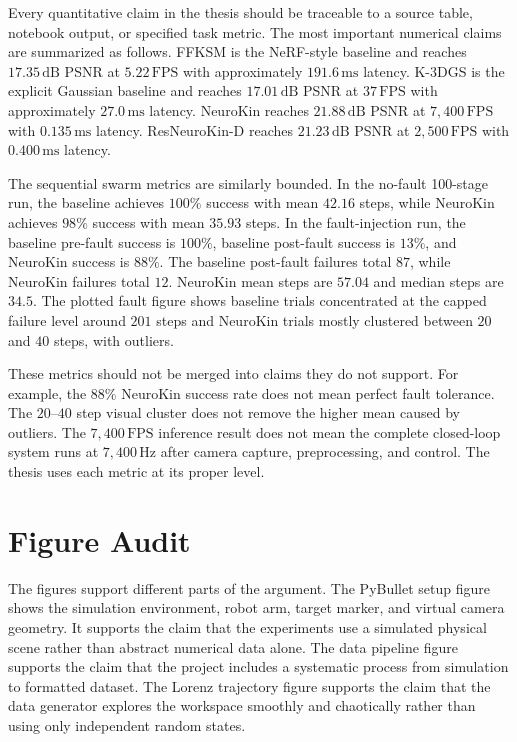 \documentclass[12pt,a4paper,oneside]{report}
\begin{document}
Every quantitative claim in the thesis should be traceable to a source table, notebook output, or specified task metric. The most important numerical claims are summarized as follows. FFKSM is the NeRF-style baseline and reaches $17.35\,\mathrm{dB}$ PSNR at $5.22\,\mathrm{FPS}$ with approximately $191.6\,\mathrm{ms}$ latency. K-3DGS is the explicit Gaussian baseline and reaches $17.01\,\mathrm{dB}$ PSNR at $37\,\mathrm{FPS}$ with approximately $27.0\,\mathrm{ms}$ latency. NeuroKin reaches $21.88\,\mathrm{dB}$ PSNR at $7{,}400\,\mathrm{FPS}$ with $0.135\,\mathrm{ms}$ latency. ResNeuroKin-D reaches $21.23\,\mathrm{dB}$ PSNR at $2{,}500\,\mathrm{FPS}$ with $0.400\,\mathrm{ms}$ latency.

The sequential swarm metrics are similarly bounded. In the no-fault 100-stage run, the baseline achieves $100\%$ success with mean $42.16$ steps, while NeuroKin achieves $98\%$ success with mean $35.93$ steps. In the fault-injection run, the baseline pre-fault success is $100\%$, baseline post-fault success is $13\%$, and NeuroKin success is $88\%$. The baseline post-fault failures total $87$, while NeuroKin failures total $12$. NeuroKin mean steps are $57.04$ and median steps are $34.5$. The plotted fault figure shows baseline trials concentrated at the capped failure level around $201$ steps and NeuroKin trials mostly clustered between $20$ and $40$ steps, with outliers.

These metrics should not be merged into claims they do not support. For example, the $88\%$ NeuroKin success rate does not mean perfect fault tolerance. The $20$--$40$ step visual cluster does not remove the higher mean caused by outliers. The $7{,}400\,\mathrm{FPS}$ inference result does not mean the complete closed-loop system runs at $7{,}400\,\mathrm{Hz}$ after camera capture, preprocessing, and control. The thesis uses each metric at its proper level.

\section{Figure Audit}

The figures support different parts of the argument. The PyBullet setup figure shows the simulation environment, robot arm, target marker, and virtual camera geometry. It supports the claim that the experiments use a simulated physical scene rather than abstract numerical data alone. The data pipeline figure supports the claim that the project includes a systematic process from simulation to formatted dataset. The Lorenz trajectory figure supports the claim that the data generator explores the workspace smoothly and chaotically rather than using only independent random states.
\end{document}
